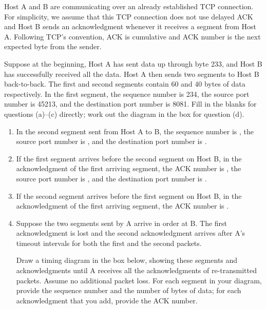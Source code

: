 \documentclass{report}
\begin{document}
\mktitle


\begin{problem}
Host A and B are communicating over an already established TCP connection.
For simplicity, we assume that this TCP connection does not use delayed ACK and Host B sends an acknowledgment whenever it receives a segment from Host A. Following TCP's convention, ACK is cumulative and ACK number is the next expected byte from the sender.

Suppose at the beginning, Host A has sent data up through byte 233, and Host B has successfully received all the data. Host A then sends two segments to Host B back-to-back.
The first and second segments contain 60 and 40 bytes of data respectively.
In the first segment, the sequence number is 234, the source port number is 45213, and the destination port number is 8081.
Fill in the blanks for questions (a)--(c) directly; work out the diagram in the box for question (d).

\begin{enumerate}
  \item In the second segment sent from Host A to B, the sequence number is \underline{\quad\quad\quad}, the source port number is \underline{\quad\quad\quad}, and the destination port number is \underline{\quad\quad\quad}.
  \item If the first segment arrives before the second segment on Host B, in the acknowledgment of the first arriving segment, the ACK number is \underline{\quad\quad\quad}, the source port number is \underline{\quad\quad\quad}, and the destination port number is \underline{\quad\quad\quad}.
  \item If the second segment arrives before the first segment on Host B, in the acknowledgment of the first arriving segment, the ACK number is \underline{\quad\quad\quad}.
  \item Suppose the two segments sent by A arrive in order at B.
  The first acknowledgment is lost and the second acknowledgment arrives after A's timeout intervals for both the first and the second packets.
 
  
  Draw a timing diagram in the box below, showing these segments and acknowledgments until A receives all the acknowledgments of re-transmitted packets.
  Assume no additional packet loss.
  For each segment in your diagram, provide the sequence number and the number of bytes of data; for each acknowledgment that you add, provide the ACK number.
\end{enumerate}



\end{problem}
\end{document}
